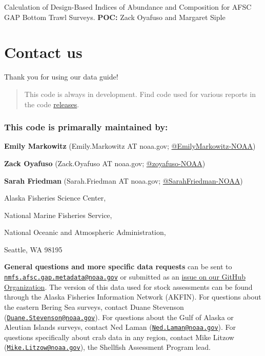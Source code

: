 \documentclass[
  letterpaper,
  oneside,
  open=any]{scrbook}
\begin{document}
Calculation of Design-Based Indices of Abundance and Composition for
AFSC GAP Bottom Trawl Surveys. \textbf{POC:} Zack Oyafuso and Margaret
Siple

\part{Contact us}

Thank you for using our data guide!

\begin{quote}
This code is always in development. Find code used for various reports
in the code
\href{https://github.com/afsc-gap-products/gap_products/releases}{releases}.
\end{quote}

\section*{This code is primarally maintained
by:}\label{this-code-is-primarally-maintained-by}


\textbf{Emily Markowitz} (Emily.Markowitz AT noaa.gov;
\href{https://github.com/EmilyMarkowitz-NOAA}{@EmilyMarkowitz-NOAA})

\textbf{Zack Oyafuso} (Zack.Oyafuso AT noaa.gov;
\href{https://github.com/zoyafuso-NOAA}{@zoyafuso-NOAA})

\textbf{Sarah Friedman} (Sarah.Friedman AT noaa.gov;
\href{https://github.com/SarahFriedman-NOAA}{@SarahFriedman-NOAA})

Alaska Fisheries Science Center,

National Marine Fisheries Service,

National Oceanic and Atmospheric Administration,

Seattle, WA 98195

\textbf{General questions and more specific data requests} can be sent
to
\href{mailto:nmfs.afsc.gap.metadata@noaa.gov}{\nolinkurl{nmfs.afsc.gap.metadata@noaa.gov}}
or submitted as an
\href{https://github.com/afsc-gap-products/data-requests}{issue on our
GitHub Organization}. The version of this data used for stock
assessments can be found through the Alaska Fisheries Information
Network (AKFIN). For questions about the eastern Bering Sea surveys,
contact Duane Stevenson
(\href{mailto:Duane.Stevenson@noaa.gov}{\nolinkurl{Duane.Stevenson@noaa.gov}}).
For questions about the Gulf of Alaska or Aleutian Islands surveys,
contact Ned Laman
(\href{mailto:Ned.Laman@noaa.gov}{\nolinkurl{Ned.Laman@noaa.gov}}). For
questions specifically about crab data in any region, contact Mike
Litzow
(\href{mailto:Mike.Litzow@noaa.gov}{\nolinkurl{Mike.Litzow@noaa.gov}}),
the Shellfish Assessment Program lead.
\end{document}
